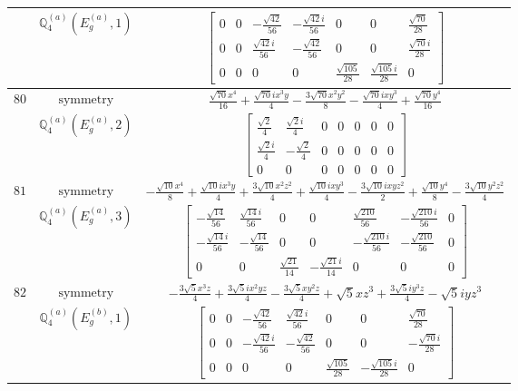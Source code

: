 \documentclass[fleqn,8pt,landscape]{jsarticle}
\begin{document}
\begin{longtable}{ccc}
$  $ & $ \mathbb{Q}_{4}^{(a)}(E_{g}^{(a)},1) $ & $ \begin{bmatrix} 0 & 0 & - \frac{\sqrt{42}}{56} & - \frac{\sqrt{42} i}{56} & 0 & 0 & \frac{\sqrt{70}}{28} \\ 0 & 0 & \frac{\sqrt{42} i}{56} & - \frac{\sqrt{42}}{56} & 0 & 0 & \frac{\sqrt{70} i}{28} \\ 0 & 0 & 0 & 0 & \frac{\sqrt{105}}{28} & \frac{\sqrt{105} i}{28} & 0 \end{bmatrix} $ \\ \hline
$ 80 $ & $ \text{symmetry} $ & $ \frac{\sqrt{70} x^{4}}{16} + \frac{\sqrt{70} i x^{3} y}{4} - \frac{3 \sqrt{70} x^{2} y^{2}}{8} - \frac{\sqrt{70} i x y^{3}}{4} + \frac{\sqrt{70} y^{4}}{16} $ \\
$  $ & $ \mathbb{Q}_{4}^{(a)}(E_{g}^{(a)},2) $ & $ \begin{bmatrix} \frac{\sqrt{2}}{4} & \frac{\sqrt{2} i}{4} & 0 & 0 & 0 & 0 & 0 \\ \frac{\sqrt{2} i}{4} & - \frac{\sqrt{2}}{4} & 0 & 0 & 0 & 0 & 0 \\ 0 & 0 & 0 & 0 & 0 & 0 & 0 \end{bmatrix} $ \\ \hline
$ 81 $ & $ \text{symmetry} $ & $ - \frac{\sqrt{10} x^{4}}{8} + \frac{\sqrt{10} i x^{3} y}{4} + \frac{3 \sqrt{10} x^{2} z^{2}}{4} + \frac{\sqrt{10} i x y^{3}}{4} - \frac{3 \sqrt{10} i x y z^{2}}{2} + \frac{\sqrt{10} y^{4}}{8} - \frac{3 \sqrt{10} y^{2} z^{2}}{4} $ \\
$  $ & $ \mathbb{Q}_{4}^{(a)}(E_{g}^{(a)},3) $ & $ \begin{bmatrix} - \frac{\sqrt{14}}{56} & \frac{\sqrt{14} i}{56} & 0 & 0 & \frac{\sqrt{210}}{56} & - \frac{\sqrt{210} i}{56} & 0 \\ - \frac{\sqrt{14} i}{56} & - \frac{\sqrt{14}}{56} & 0 & 0 & - \frac{\sqrt{210} i}{56} & - \frac{\sqrt{210}}{56} & 0 \\ 0 & 0 & \frac{\sqrt{21}}{14} & - \frac{\sqrt{21} i}{14} & 0 & 0 & 0 \end{bmatrix} $ \\ \hline
$ 82 $ & $ \text{symmetry} $ & $ - \frac{3 \sqrt{5} x^{3} z}{4} + \frac{3 \sqrt{5} i x^{2} y z}{4} - \frac{3 \sqrt{5} x y^{2} z}{4} + \sqrt{5} x z^{3} + \frac{3 \sqrt{5} i y^{3} z}{4} - \sqrt{5} i y z^{3} $ \\
$  $ & $ \mathbb{Q}_{4}^{(a)}(E_{g}^{(b)},1) $ & $ \begin{bmatrix} 0 & 0 & - \frac{\sqrt{42}}{56} & \frac{\sqrt{42} i}{56} & 0 & 0 & \frac{\sqrt{70}}{28} \\ 0 & 0 & - \frac{\sqrt{42} i}{56} & - \frac{\sqrt{42}}{56} & 0 & 0 & - \frac{\sqrt{70} i}{28} \\ 0 & 0 & 0 & 0 & \frac{\sqrt{105}}{28} & - \frac{\sqrt{105} i}{28} & 0 \end{bmatrix} $ \\ \hline

\end{longtable}
\end{document}
